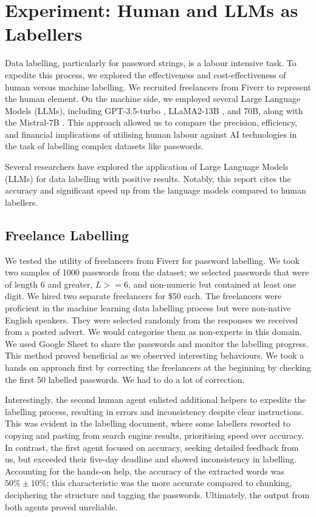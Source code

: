 \section{Experiment: Human and LLMs as Labellers}
\label{section:experiment1}

Data labelling, particularly for password strings, is a labour intensive task. To expedite this process, we explored the effectiveness and cost-effectiveness of human versus machine labelling. We recruited freelancers from Fiverr \cite{fiverr2024} to represent the human element. On the machine side, we employed several Large Language Models (LLMs), including GPT-3.5-turbo \cite{gpt3.5}, LLaMA2-13B \cite{llama2}, and 70B, along with the Mistral-7B \cite{mistral7b}. This approach allowed us to compare the precision, efficiency, and financial implications of utilising human labour against AI technologies in the task of labelling complex datasets like passwords.

Several researchers have explored the application of Large Language Models (LLMs) for data labelling \cite{Pangakis_Wolken_Fasching_2023, Liu_2023, Møller_Dalsgaard_Pera_Aiello_2024} with positive results. Notably, this report \cite{refuelllm} cites the accuracy and significant speed up from the language models compared to human labellers.

\subsection{Freelance Labelling}
We tested the utility of freelancers from Fiverr \cite{fiverr2024} for password labelling. We took two samples of 1000 passwords from the \phpbb dataset; we selected passwords that were of length 6 and greater, $L >= 6$, and non-numeric but contained at least one digit. We hired two separate freelancers for \$50 each. The freelancers were proficient in the machine learning data labelling process but were non-native English speakers. They were selected randomly from the responses we received from a posted advert. We would categorise them as non-experts in this domain. We used Google Sheet to share the passwords and monitor the labelling progress. This method proved beneficial as we observed interesting behaviours. We took a hands on approach first by correcting the freelancers at the beginning by checking the first 50 labelled passwords. We had to do a lot of correction.

Interestingly, the second human agent enlisted additional helpers to expedite the labelling process, resulting in errors and inconsistency despite clear instructions. This was evident in the labelling document, where some labellers resorted to copying and pasting from search engine results, prioritising speed over accuracy. In contrast, the first agent focused on accuracy, seeking detailed feedback from us, but exceeded their five-day deadline and showed inconsistency in labelling. Accounting for the hands-on help, the accuracy of the extracted words was $50\% \pm 10\%$; this characteristic was the more accurate compared to chunking, deciphering the structure and tagging the passwords. Ultimately, the output from both agents proved unreliable.


